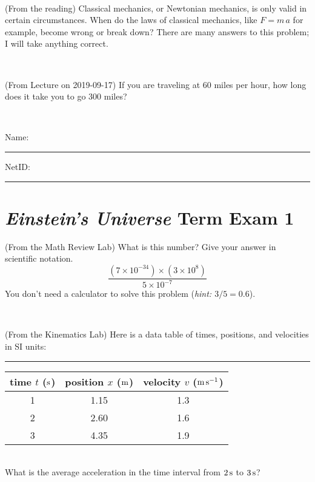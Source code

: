 \documentclass[12pt, letterpaper]{article}
\begin{document}
\vfill ~

\begin{problem} (From the reading)
Classical mechanics, or Newtonian mechanics, is only valid in certain
circumstances. When do the laws of classical mechanics, like $F =
m\,a$ for example, become wrong or break down? There are many answers
to this problem; I will take anything correct.
\end{problem}


\vfill ~

\begin{problem} (From Lecture on 2019-09-17)
If you are traveling at 60 miles per hour, how long does
it take you to go 300 miles?
\end{problem}


\vfill ~


\cleardoublepage



\noindent
Name: \rule[-1ex]{0.60\textwidth}{0.1pt}
NetID: \rule[-1ex]{0.20\textwidth}{0.1pt}

\section*{\textsl{Einstein's Universe} Term Exam 1}
\setcounter{problem}{1}


\begin{problem} (From the Math Review Lab)
What is this number? Give your answer in scientific notation.
$$
\frac{(7\times10^{-34})\times(3\times10^8)}{5\times10^{-7}}
$$
You don't need a calculator to solve this problem (\textit{hint: $3/5=0.6$}).
\end{problem}


\vfill ~

\begin{problem} (From the Kinematics Lab)
Here is a data table of times, positions, and velocities in SI units:\\
\rule{1.0in}{0pt}\begin{tabular}{c|c|c}
time $t$ ($\mathrm{s}$) & position $x$ ($\mathrm{m}$) & velocity $v$ ($\mathrm{m}\,\mathrm{s}^{-1}$) \\
\hline
1 & 1.15 & 1.3 \\
2 & 2.60 & 1.6 \\
3 & 4.35 & 1.9 \\
\hline
\end{tabular}\\
What is the average acceleration in the time interval from $2\,\mathrm{s}$ to $3\,\mathrm{s}$?
\end{problem}
\end{document}
